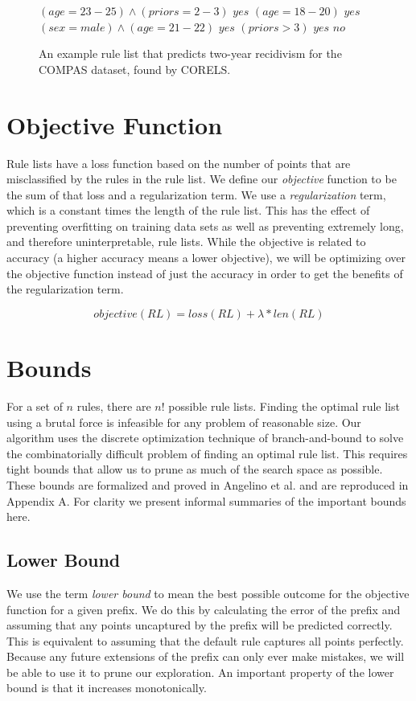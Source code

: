 \begin{figure}[t!]
\begin{algorithmic}
\normalsize
\State \bif $(age=23-25) \wedge (priors=2-3)$ \bthen $yes$
\State \belif $(age=18-20)$ \bthen $yes$
\State \belif $(sex=male) \wedge (age=21-22)$ \bthen $yes$
\State \belif $(priors>3)$ \bthen $yes$
\State \belse $no$
\end{algorithmic}
\caption{An example rule list that predicts two-year recidivism for the COMPAS dataset, found by CORELS.}
\label{fig:rule-list}
\end{figure}

\section{Objective Function}
Rule lists have a loss function based on the number of points that are misclassified by the rules in the rule list.
We define our \textit{objective} function to be the sum of that loss and a regularization term.
We use a \textit{regularization} term, which is a constant times the length of the rule list.
This has the effect of preventing overfitting on training data sets as well as preventing extremely long, and therefore uninterpretable, rule lists.
While the objective is related to accuracy (a higher accuracy means a lower objective), we will be optimizing over the objective function instead of just the accuracy in order to get the benefits of the regularization term.

$$objective(RL) = loss(RL) + \lambda * len(RL)$$ 

\section{Bounds}\label{sec:bounds}
For a set of $n$ rules, there are $n!$ possible rule lists.
Finding the optimal rule list using a brutal force is infeasible for any problem of reasonable size.
Our algorithm uses the discrete optimization technique of branch-and-bound to solve the combinatorially difficult problem of finding an optimal rule list.
This requires tight bounds that allow us to prune as much of the search space as possible.
These bounds are formalized and proved in Angelino et al. \cite{AngelinoLaAlSeRu17} and are reproduced in Appendix A.
For clarity we present informal summaries of the important bounds here.

\subsection{Lower Bound}
We use the term \textit{lower bound} to mean the best possible outcome for the objective function for a given prefix.
We do this by calculating the error of the prefix and assuming that any points uncaptured by the prefix will be predicted correctly.
This is equivalent to assuming that the default rule captures all points perfectly.
Because any future extensions of the prefix can only ever make mistakes, we will be able to use it to prune our exploration.
An important property of the lower bound is that it increases monotonically.

